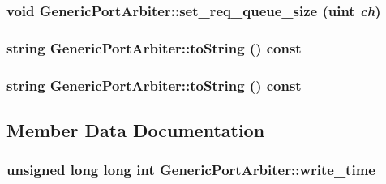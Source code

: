 \hypertarget{classGenericPortArbiter_50daec6e98669e01d74557dfb84b462f}{
\subsubsection[{set\_\-req\_\-queue\_\-size}]{\setlength{\rightskip}{0pt plus 5cm}void GenericPortArbiter::set\_\-req\_\-queue\_\-size ({\bf uint} {\em ch})}}
\label{classGenericPortArbiter_50daec6e98669e01d74557dfb84b462f}


\hypertarget{classGenericPortArbiter_1ceacc98efaee4d98b4f65a401ea10e2}{
\subsubsection[{toString}]{\setlength{\rightskip}{0pt plus 5cm}string GenericPortArbiter::toString () const}}
\label{classGenericPortArbiter_1ceacc98efaee4d98b4f65a401ea10e2}


\hypertarget{classGenericPortArbiter_1ceacc98efaee4d98b4f65a401ea10e2}{
\subsubsection[{toString}]{\setlength{\rightskip}{0pt plus 5cm}string GenericPortArbiter::toString () const}}
\label{classGenericPortArbiter_1ceacc98efaee4d98b4f65a401ea10e2}




\subsection{Member Data Documentation}
\hypertarget{classGenericPortArbiter_bccdf314a1920de58357e0d2f62f427e}{
\subsubsection[{write\_\-time}]{\setlength{\rightskip}{0pt plus 5cm}unsigned long long int {\bf GenericPortArbiter::write\_\-time}}}
\label{classGenericPortArbiter_bccdf314a1920de58357e0d2f62f427e}




